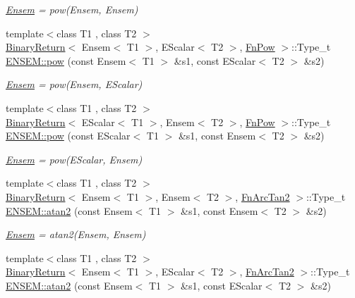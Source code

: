 \begin{DoxyCompactItemize}
\begin{DoxyCompactList}\small\item\em \mbox{\hyperlink{classENSEM_1_1Ensem}{Ensem}} = pow(\+Ensem, Ensem) \end{DoxyCompactList}\item 
{\footnotesize template$<$class T1 , class T2 $>$ }\\\mbox{\hyperlink{structBinaryReturn}{Binary\+Return}}$<$ Ensem$<$ T1 $>$, E\+Scalar$<$ T2 $>$, \mbox{\hyperlink{structFnPow}{Fn\+Pow}} $>$\+::Type\+\_\+t \mbox{\hyperlink{group__eensem_ga56e0a919e0060bdb32e0b2aa9ea97f11}{E\+N\+S\+E\+M\+::pow}} (const Ensem$<$ T1 $>$ \&s1, const E\+Scalar$<$ T2 $>$ \&s2)
\begin{DoxyCompactList}\small\item\em \mbox{\hyperlink{classENSEM_1_1Ensem}{Ensem}} = pow(\+Ensem, E\+Scalar) \end{DoxyCompactList}\item 
{\footnotesize template$<$class T1 , class T2 $>$ }\\\mbox{\hyperlink{structBinaryReturn}{Binary\+Return}}$<$ E\+Scalar$<$ T1 $>$, Ensem$<$ T2 $>$, \mbox{\hyperlink{structFnPow}{Fn\+Pow}} $>$\+::Type\+\_\+t \mbox{\hyperlink{group__eensem_gae3b272ae394d114d478f320d24ca05df}{E\+N\+S\+E\+M\+::pow}} (const E\+Scalar$<$ T1 $>$ \&s1, const Ensem$<$ T2 $>$ \&s2)
\begin{DoxyCompactList}\small\item\em \mbox{\hyperlink{classENSEM_1_1Ensem}{Ensem}} = pow(\+E\+Scalar, Ensem) \end{DoxyCompactList}\item 
{\footnotesize template$<$class T1 , class T2 $>$ }\\\mbox{\hyperlink{structBinaryReturn}{Binary\+Return}}$<$ Ensem$<$ T1 $>$, Ensem$<$ T2 $>$, \mbox{\hyperlink{structFnArcTan2}{Fn\+Arc\+Tan2}} $>$\+::Type\+\_\+t \mbox{\hyperlink{group__eensem_ga4a9f9b7400c5d7cbbb6f6118ca6a3c47}{E\+N\+S\+E\+M\+::atan2}} (const Ensem$<$ T1 $>$ \&s1, const Ensem$<$ T2 $>$ \&s2)
\begin{DoxyCompactList}\small\item\em \mbox{\hyperlink{classENSEM_1_1Ensem}{Ensem}} = atan2(\+Ensem, Ensem) \end{DoxyCompactList}\item 
{\footnotesize template$<$class T1 , class T2 $>$ }\\\mbox{\hyperlink{structBinaryReturn}{Binary\+Return}}$<$ Ensem$<$ T1 $>$, E\+Scalar$<$ T2 $>$, \mbox{\hyperlink{structFnArcTan2}{Fn\+Arc\+Tan2}} $>$\+::Type\+\_\+t \mbox{\hyperlink{group__eensem_gabe797638db840fa2cddca1e1d133fc55}{E\+N\+S\+E\+M\+::atan2}} (const Ensem$<$ T1 $>$ \&s1, const E\+Scalar$<$ T2 $>$ \&s2)

\end{DoxyCompactItemize}
